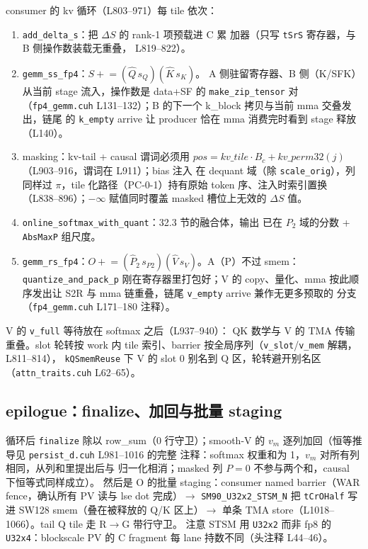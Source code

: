 consumer 的 kv 循环（L803--971）每 tile 依次：
\begin{enumerate}[itemsep=0pt,topsep=2pt]
  \item \texttt{add\_delta\_s}：把 $\Delta S$ 的 rank-1 项预载进 C 累
        加器（只写 \texttt{tSrS} 寄存器，与 B 侧操作数装载无重叠，
        L819--822）。
  \item \texttt{gemm\_ss\_fp4}：$S\mathrel{+}= (\hat Q\,s_Q)(\hat K\,s_K)$。
        A 侧驻留寄存器、B 侧（K/SFK）从当前 stage 流入，操作数是
        data+SF 的 \texttt{make\_zip\_tensor} 对（\texttt{fp4\_gemm.cuh}
        L131--132）；B 的下一个 k\_block 拷贝与当前 mma 交叠发出，链尾
        的 \texttt{k\_empty} arrive 让 producer 恰在 mma 消费完时看到
        stage 释放（L140）。
  \item masking：kv-tail + causal 谓词必须用
        $pos=kv\_tile\cdot B_c+kv\_perm32(j)$（L903--916，谓词在
        L911）；bias 注入
        在 dequant 域（除 \texttt{scale\_orig}），列同样过 $\pi$，tile
        化路径（PC-0-1）持有原始 token 序、注入时索引置换
        （L838--896）；$-\infty$ 赋值同时覆盖 masked 槽位上无效的
        $\Delta S$ 值。
  \item \texttt{online\_softmax\_with\_quant}：32.3 节的融合体，输出
        已在 $P_2$ 域的分数 + \texttt{AbsMaxP} 组尺度。
  \item \texttt{gemm\_rs\_fp4}：$O\mathrel{+}= (\hat P_2\,s_{P2})
        (\hat V\,s_V)$。A（P）不过 smem：\texttt{quantize\_and\_pack\_p}
        刚在寄存器里打包好；V 的 copy、量化、mma 按此顺序发出让 S2R
        与 mma 链重叠，链尾 \texttt{v\_empty} arrive 兼作无更多预取的
        分支（\texttt{fp4\_gemm.cuh} L171--180 注释）。
\end{enumerate}

V 的 \texttt{v\_full} 等待放在 softmax 之后（L937--940）：
QK 数学与 V 的 TMA 传输重叠。slot 轮转按 work 内 tile 索引、barrier
按全局序列（\texttt{v\_slot}/\texttt{v\_mem} 解耦，L811--814），
\texttt{kQSmemReuse} 下 V 的 slot 0 别名到 Q 区，轮转避开别名区
（\texttt{attn\_traits.cuh} L62--65）。

\subsection{epilogue：finalize、加回与批量 staging}

循环后 \texttt{finalize} 除以 row\_sum（0 行守卫）；smooth-V 的
$v_m$ 逐列加回（恒等推导见 \texttt{persist\_d.cuh} L981--1016 的完整
注释：softmax 权重和为 1，$v_m$ 对所有列相同，从列和里提出后与
归一化相消；masked 列 $P=0$ 不参与两个和，causal 下恒等式同样成立）。
然后是 O 的批量 staging：consumer named barrier（WAR fence，确认所有
PV 读与 lse dot 完成）$\to$ \texttt{SM90\_U32x2\_STSM\_N} 把
\texttt{tCrOHalf} 写进 SW128 smem（叠在被释放的 Q/K 区上）$\to$
单条 TMA store（L1018--1066）。tail Q tile 走 R$\to$G 带行守卫。
注意 STSM 用 \texttt{U32x2} 而非 fp8 的 \texttt{U32x4}：blockscale
PV 的 C fragment 每 lane 持数不同（头注释 L44--46）。

